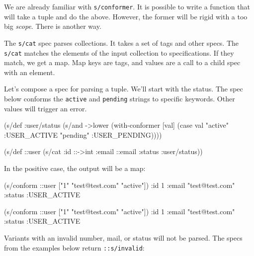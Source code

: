 We are already familiar with \verb|s/conformer|. It is possible to write a function that will take a tuple and do the above. However, the former will be rigid with a too big \emph{scope}. There is another way.


The \verb|s/cat| spec parses collections. It takes a set of tags and other specs. The \verb|s/cat| matches the elements of the input collection to specifications. If they match, we get a map. Map keys are tags, and values are a call to a child spec with an element.

Let's compose a spec for parsing a tuple. We'll start with the status. The spec below conforms the \verb|active| and \verb|pending| strings to specific keywords. Other values will trigger an error.
 
\begin{english}
  \begin{clojure}
(s/def :user/status
  (s/and ->lower
         (with-conformer [val]
           (case val
             "active"  :USER_ACTIVE
             "pending" :USER_PENDING))))

(s/def ::user
  (s/cat :id ::->int
         :email ::email
         :status :user/status))
  \end{clojure}
\end{english}

\noindent
In the positive case, the output will be a map:

\ifx\DEVICETYPE\MOBILE

\begin{english}
  \begin{clojure}
(s/conform ::user
  ["1" "test@test.com" "active"])
{:id 1
 :email "test@test.com"
 :status :USER_ACTIVE}
  \end{clojure}
\end{english}

\else

\begin{english}
  \begin{clojure}
(s/conform ::user ["1" "test@test.com" "active"])
{:id 1
 :email "test@test.com"
 :status :USER_ACTIVE}
  \end{clojure}
\end{english}

\fi

Variants with an invalid number, mail, or status will not be parsed. The specs from the examples below return \verb|::s/invalid|: 

\ifx\DEVICETYPE\MOBILE


